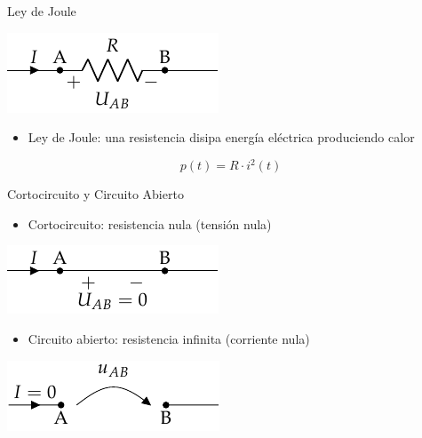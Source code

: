 \documentclass[aspectratio=169, xcolor={usenames,svgnames,dvipsnames}]{beamer}
\begin{document}
\begin{frame}{Ley de Joule}
\begin{center}
\includegraphics[height=0.2\textheight]{../figs/Resistencia.pdf}
\end{center}

\begin{itemize}
\item \alert{Ley de Joule}: una resistencia disipa energía eléctrica produciendo \alert{calor}
\end{itemize}
\[
\boxed{p(t)=R\cdot i^{2}(t)}
\]
\end{frame}

\begin{frame}{Cortocircuito y Circuito Abierto}
\begin{itemize}
\item Cortocircuito: resistencia nula (tensión nula)
\end{itemize}

\begin{center}
\includegraphics[height=0.2\textheight]{../figs/Cortocircuito.pdf}
\end{center}

\begin{itemize}
\item Circuito abierto: resistencia infinita (corriente nula)
\end{itemize}

\begin{center}
\includegraphics[height=0.2\textheight]{../figs/CircuitoAbierto.pdf}
\end{center}
\end{frame}
\end{document}
